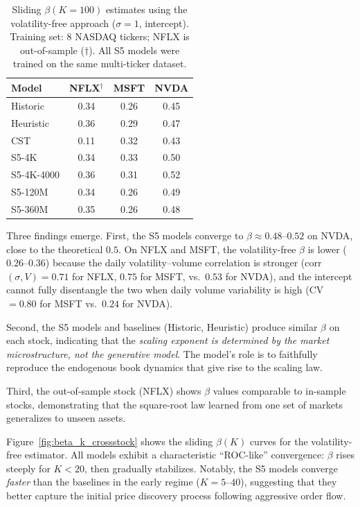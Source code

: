 \documentclass[sigplan,screen,anonymous]{acmart}
\begin{document}
\begin{table}[t]
  \caption{Sliding $\beta(K{=}100)$ estimates using the volatility-free approach ($\sigma=1$, intercept). Training set: 8 NASDAQ tickers; NFLX is out-of-sample ($\dagger$). All S5 models were trained on the same multi-ticker dataset.}
  \label{tab:crossstock}
  \centering
  \small
  \begin{tabular}{@{}lccc@{}}
    \toprule
    Model & NFLX$^{\dagger}$ & MSFT & NVDA \\
    \midrule
    Historic    & 0.34 & 0.26 & 0.45 \\
    Heuristic   & 0.36 & 0.29 & 0.47 \\
    CST         & 0.11 & 0.32 & 0.43 \\
    S5-4K       & 0.34 & 0.33 & 0.50 \\
    S5-4K-4000  & 0.36 & 0.31 & 0.52 \\
    S5-120M     & 0.34 & 0.26 & 0.49 \\
    S5-360M     & 0.35 & 0.26 & 0.48 \\
    \bottomrule
  \end{tabular}
\end{table}

Three findings emerge. First, the S5 models converge to $\beta \approx 0.48$--$0.52$ on NVDA, close to the theoretical $0.5$. On NFLX and MSFT, the volatility-free $\beta$ is lower ($0.26$--$0.36$) because the daily volatility--volume correlation is stronger (corr$(\sigma, V) = 0.71$ for NFLX, $0.75$ for MSFT, vs.\ $0.53$ for NVDA), and the intercept cannot fully disentangle the two when daily volume variability is high (CV $= 0.80$ for MSFT vs.\ $0.24$ for NVDA).

Second, the S5 models and baselines (Historic, Heuristic) produce similar $\beta$ on each stock, indicating that the \emph{scaling exponent is determined by the market microstructure, not the generative model}. The model's role is to faithfully reproduce the endogenous book dynamics that give rise to the scaling law.

Third, the out-of-sample stock (NFLX) shows $\beta$ values comparable to in-sample stocks, demonstrating that the square-root law learned from one set of markets generalizes to unseen assets.

Figure~\ref{fig:beta_k_crossstock} shows the sliding $\beta(K)$ curves for the volatility-free estimator. All models exhibit a characteristic ``ROC-like'' convergence: $\beta$ rises steeply for $K < 20$, then gradually stabilizes. Notably, the S5 models converge \emph{faster} than the baselines in the early regime ($K = 5$--$40$), suggesting that they better capture the initial price discovery process following aggressive order flow.
\end{document}
